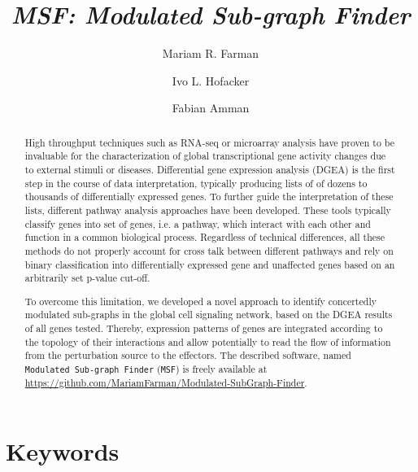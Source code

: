\documentclass[10pt,a4paper,twocolumn]{article}
\begin{document}
\title{\textit{MSF: Modulated Sub-graph Finder} }

\author[1]{Mariam R. Farman}
\author[1]{Ivo L. Hofacker}
\author[1,2]{Fabian Amman}



\maketitle
\thispagestyle{fancy}

\begin{abstract}

High throughput techniques such as RNA-seq or microarray analysis have
proven to be invaluable for the characterization of global transcriptional
gene activity changes due to external stimuli or diseases. Differential
gene expression analysis (DGEA) is the first step in the course of data
interpretation, typically producing lists of of dozens to thousands of
differentially expressed genes. To further guide the interpretation of
these lists, different pathway analysis approaches have been
developed. These tools typically classify genes into set of genes, i.e. a
pathway, which interact with each other and function in a common biological
process. Regardless of technical differences, all these methods do not
properly account for cross talk between different pathways and rely on
binary classification into differentially expressed gene and unaffected
genes based on an arbitrarily set p-value cut-off.

To overcome this limitation, we developed a novel approach to identify
concertedly modulated sub-graphs in the global cell signaling network,
based on the DGEA results of all genes tested. Thereby, expression
patterns of genes are integrated according to the topology of their
interactions and allow potentially to read the flow of information
from the perturbation source to the effectors. The described software,
named \texttt{Modulated Sub-graph Finder} (\texttt{MSF}) is freely available at
\url{https://github.com/MariamFarman/Modulated-SubGraph-Finder}.

\end{abstract}

\section*{Keywords}
\end{document}
